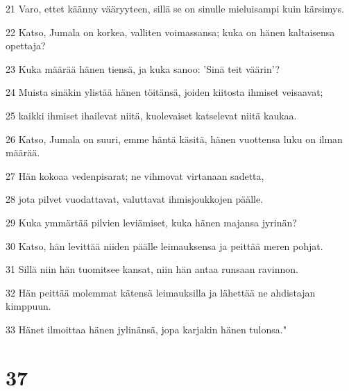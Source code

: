 \par 21 Varo, ettet käänny vääryyteen, sillä se on sinulle mieluisampi kuin kärsimys.
\par 22 Katso, Jumala on korkea, valliten voimassansa; kuka on hänen kaltaisensa opettaja?
\par 23 Kuka määrää hänen tiensä, ja kuka sanoo: 'Sinä teit väärin'?
\par 24 Muista sinäkin ylistää hänen töitänsä, joiden kiitosta ihmiset veisaavat;
\par 25 kaikki ihmiset ihailevat niitä, kuolevaiset katselevat niitä kaukaa.
\par 26 Katso, Jumala on suuri, emme häntä käsitä, hänen vuottensa luku on ilman määrää.
\par 27 Hän kokoaa vedenpisarat; ne vihmovat virtanaan sadetta,
\par 28 jota pilvet vuodattavat, valuttavat ihmisjoukkojen päälle.
\par 29 Kuka ymmärtää pilvien leviämiset, kuka hänen majansa jyrinän?
\par 30 Katso, hän levittää niiden päälle leimauksensa ja peittää meren pohjat.
\par 31 Sillä niin hän tuomitsee kansat, niin hän antaa runsaan ravinnon.
\par 32 Hän peittää molemmat kätensä leimauksilla ja lähettää ne ahdistajan kimppuun.
\par 33 Hänet ilmoittaa hänen jylinänsä, jopa karjakin hänen tulonsa."

\chapter{37}

